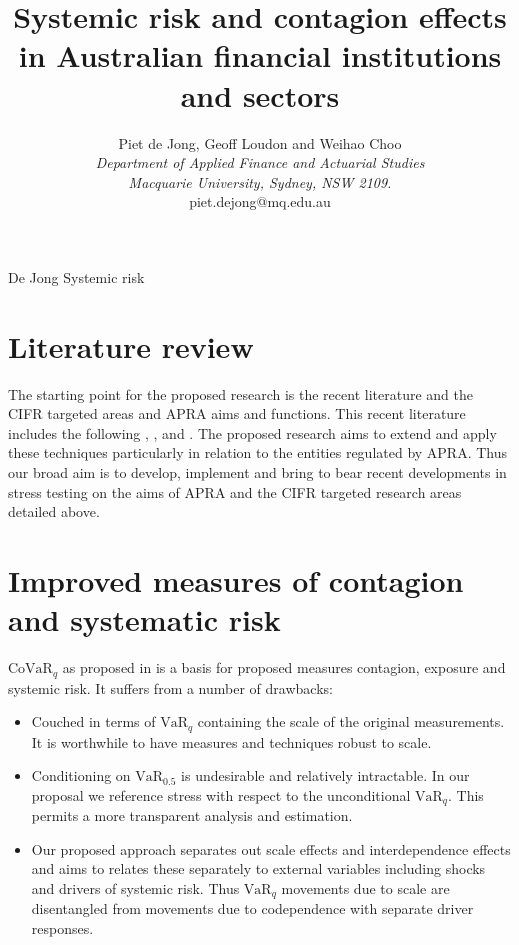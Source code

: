 \documentclass[authoryear]{elsarticle}
\newcommand{\bi}{\begin{itemize}}
\newcommand{\ei}{\end{itemize}}
\renewcommand{\i}{\item}
\newcommand{\var}{\ensuremath{\mathrm{VaR}}}
\newcommand{\covar}{\ensuremath{\mathrm{CoVaR}}}
\renewcommand{\v}{\ensuremath{\mathrm{v}_q}}
\begin{document}
\title{Systemic risk and contagion effects in Australian financial institutions and sectors}
\author{Piet de Jong,  Geoff Loudon and Weihao Choo \\[4pt]
\textit{Department of Applied Finance and Actuarial Studies\\ Macquarie University, Sydney, NSW 2109.}
\\[2pt]
{piet.dejong@mq.edu.au}}

\markboth%
{De Jong}
{Systemic risk}

\maketitle

\section{Literature review}

The starting point for the proposed research is the recent literature and the CIFR targeted areas and APRA aims and functions.
This recent literature includes the following
\cite{adrian2011covar},
\cite{acharya2012capital},
\cite{acharya2012measuring}
and \cite{brownlees2010volatility}.   The proposed research aims to extend and apply these techniques particularly in relation to the entities regulated by APRA.   Thus our  broad aim is to develop, implement and bring to bear recent developments in stress testing  on the aims of APRA and the CIFR targeted research areas detailed above.   

\section{Improved  measures of contagion and systematic risk}
\renewcommand{\c}{\ensuremath{\mathrm{CoVaR_q}}}
\renewcommand{\v}{\ensuremath{\mathrm{VaR}_q}}

$\covar_q$ as proposed in \cite{adrian2011covar} is a basis for proposed measures contagion, exposure and systemic risk.   It  suffers from a number of drawbacks:
\bi
\i Couched in terms of $\var_q$ containing the scale of the original measurements.   It is worthwhile to have measures and techniques robust to scale.
\i  Conditioning  on $\var_{0.5}$ is undesirable and relatively intractable.  In our proposal we reference stress with respect  to the unconditional $\var_q$.   This permits a more transparent analysis and estimation. 
\i  Our proposed approach  separates out scale effects and interdependence effects and aims to  relates these separately to external variables including shocks and drivers of systemic risk.   Thus $\var_q$ movements due to scale are disentangled from movements due to codependence with separate driver responses.
\ei
\end{document}
